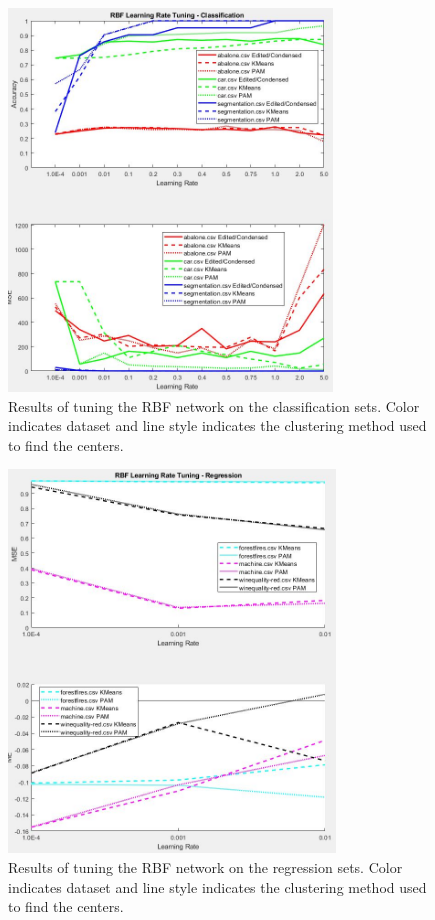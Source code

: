 \documentclass[twoside,10pt]{article}
\begin{document}
\begin{figure}[h]
	\centering
	\includegraphics[height=4in]{FINAL_FIGS/RBF_LR_TUNING_CLASS.JPG}
	\caption{Results of tuning the RBF network on the classification sets. Color indicates dataset and line style indicates the clustering method used to find the centers.}
\end{figure}
\begin{figure}[h]
	\centering
	\includegraphics[height=4in]{FINAL_FIGS/RBF_LR_TUNING_REG.JPG}
	\caption{Results of tuning the RBF network on the regression sets. Color indicates dataset and line style indicates the clustering method used to find the centers.}
\end{figure}
\end{document}
